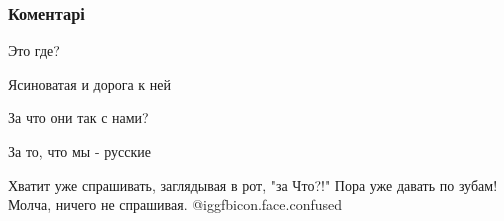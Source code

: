  
 
 
 
 
\subsubsection{Коментарі}
\label{sec:12_11_2016.fb.andrienko_julia.doneck.1.foto_vojna.cmt}

\begin{itemize} %
Это где?

Ясиноватая и дорога к ней

За что они так с нами?

За то, что мы - русские

Хватит уже спрашивать, заглядывая в рот, "за Что?!" 
Пора уже давать по зубам! Молча, ничего не спрашивая.  @igg{fbicon.face.confused} 

\end{itemize} %
